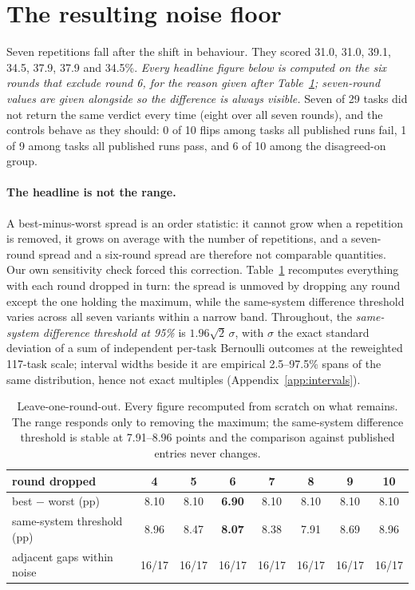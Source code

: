 \section{The resulting noise floor}
\label{sec:noise}

Seven repetitions fall after the shift in behaviour. They scored
31.0, 31.0, 39.1, 34.5, 37.9, 37.9 and 34.5\%. \emph{Every headline figure
below is computed on the six rounds that exclude round 6, for the reason given
after Table~\ref{tab:loo}; seven-round values are given alongside so the
difference is always visible.} Seven of 29 tasks did not return the
same verdict every time (eight over all seven rounds), and the controls behave
as they should: 0 of 10 flips among tasks all published runs fail, 1 of 9 among
tasks all published runs pass, and 6 of 10 among the disagreed-on group.

\paragraph{The headline is not the range.} A best-minus-worst spread is an
order statistic: it cannot grow when a repetition is removed, it grows on
average with the number of repetitions, and a seven-round spread and a
six-round spread are therefore not comparable quantities. Our own sensitivity
check forced this correction. Table~\ref{tab:loo} recomputes everything with
each round dropped in turn: the spread is unmoved by dropping any round except
the one holding the maximum, while the same-system difference threshold varies
across all seven variants within a narrow band. Throughout, the
\emph{same-system difference threshold at 95\%} is $1.96\sqrt{2}\,\sigma$, with
$\sigma$ the exact standard deviation of a sum of independent per-task
Bernoulli outcomes at the reweighted 117-task scale; interval widths beside it are empirical 2.5--97.5\% spans of
the same distribution, hence not exact multiples
(Appendix~\ref{app:intervals}).

\begin{table}[t]
\centering\small
\caption{Leave-one-round-out. Every figure recomputed from scratch on what
remains. The range responds only to removing the maximum; the same-system
difference threshold is stable at 7.91--8.96 points and the comparison against
published entries never changes.}
\label{tab:loo}
\begin{tabular}{lccccccc}
\toprule
round dropped & 4 & 5 & \textbf{6} & 7 & 8 & 9 & 10 \\
\midrule
best $-$ worst (pp) & 8.10 & 8.10 & \textbf{6.90} & 8.10 & 8.10 & 8.10 & 8.10 \\
same-system threshold (pp) & 8.96 & 8.47 & \textbf{8.07} & 8.38 & 7.91 & 8.69 & 8.96 \\
adjacent gaps within noise & 16/17 & 16/17 & 16/17 & 16/17 & 16/17 & 16/17 & 16/17 \\
\bottomrule
\end{tabular}
\end{table}

